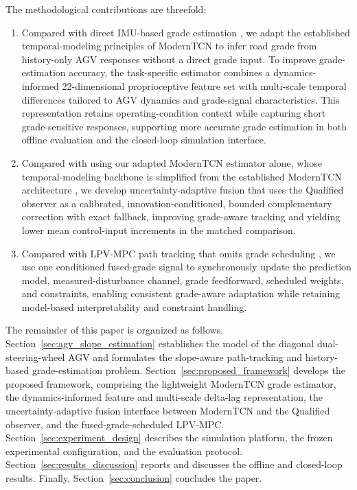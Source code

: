 \documentclass{ieeeaccess}
\newcommand{\citep}[1]{\cite{#1}}
\begin{document}
The methodological contributions are threefold:
\begin{enumerate}
\item Compared with direct IMU-based grade estimation
\citep{Jauch2018IMUGradeOrientation,Li2022QuaternionUKFGrade,
Kim2023InertialRoadPitch}, we adapt the established temporal-modeling
principles of ModernTCN \citep{Luo2024ModernTCN} to infer road grade
from history-only AGV responses without a direct grade input. To
improve grade-estimation accuracy, the task-specific estimator combines
a dynamics-informed 22-dimensional proprioceptive feature set with
multi-scale temporal differences tailored to AGV dynamics and
grade-signal characteristics. This representation retains
operating-condition context while capturing short grade-sensitive
responses, supporting more accurate grade estimation in both offline
evaluation and the closed-loop simulation interface.
	\item Compared with using our adapted ModernTCN estimator alone, whose
	temporal-modeling backbone is simplified from the established ModernTCN
	architecture \citep{Luo2024ModernTCN}, we develop uncertainty-adaptive fusion
	that uses the Qualified observer as a calibrated, innovation-conditioned,
	bounded complementary correction with exact fallback, improving grade-aware
	tracking and yielding lower mean control-input increments in the matched
	comparison.

\item Compared with LPV-MPC path tracking that omits grade scheduling
\citep{Alcala2020AutonomousRacingLPVMPC,
Tian2022GainScheduledLPVMPC,Cheng2021VelocityVaryingMPC}, we use one
conditioned fused-grade signal to synchronously update the prediction
model, measured-disturbance channel, grade feedforward, scheduled
weights, and constraints, enabling consistent grade-aware adaptation
while retaining model-based interpretability and constraint handling.
\end{enumerate}

The remainder of this paper is organized as follows.
Section~\ref{sec:agv_slope_estimation} establishes the model of the diagonal
dual-steering-wheel AGV and formulates the slope-aware path-tracking and
history-based grade-estimation problem.
Section~\ref{sec:proposed_framework} develops the proposed framework,
comprising the lightweight ModernTCN grade estimator, the dynamics-informed
feature and multi-scale delta-lag representation, the uncertainty-adaptive
fusion interface between ModernTCN and the Qualified observer, and the fused-grade-scheduled LPV-MPC.
Section~\ref{sec:experiment_design} describes the simulation platform, the
frozen experimental configuration, and the evaluation protocol.
Section~\ref{sec:results_discussion} reports and discusses the offline and
closed-loop results. Finally, Section~\ref{sec:conclusion} concludes the
paper.
\end{document}
